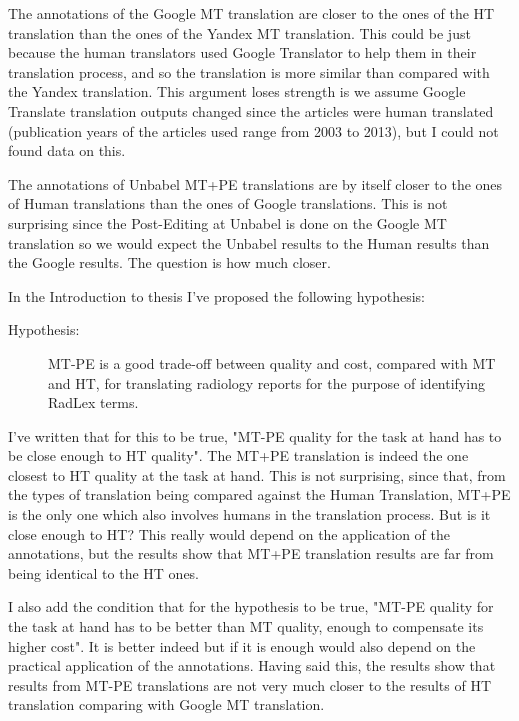The annotations of the Google MT translation are closer to the ones of the HT translation than the ones of the Yandex MT translation. This could be just because the human translators used Google Translator to help them in their translation process, and so the translation is more similar than compared with the Yandex translation. This argument loses strength is we assume Google Translate translation outputs changed since the articles were human translated (publication years of the articles used range from 2003 to 2013), but I could not found data on this. 

The annotations of Unbabel MT+PE translations are by itself closer to the ones of Human translations than the ones of Google translations. This is not surprising since the Post-Editing at Unbabel is done on the Google MT translation so we would expect the Unbabel results to the Human results than the Google results. The question is how much closer. 

In the Introduction to thesis I've proposed the following hypothesis:

\begin{description}
	\item[Hypothesis:] MT-PE is a good trade-off between quality and cost, compared with MT and HT, for translating radiology reports for the purpose of identifying RadLex terms. 
\end{description}


I've written that for this to be true, "MT-PE quality for the task at hand has to be close enough to HT quality". The MT+PE translation is indeed the one closest to HT quality at the task at hand. This is not surprising, since that, from the types of translation being compared against the Human Translation, MT+PE is the only one which also involves humans in the translation process. But is it close enough to HT? This really would depend on the application of the annotations, but the results show that MT+PE translation results are far from being identical to the HT ones.  

I also add the condition that for the hypothesis to be true, "MT-PE quality for the task at hand has to be better than MT quality, enough to compensate its higher cost". It is better indeed but if it is enough would also depend on the practical application of the annotations. Having said this, the results show that results from MT-PE translations are not very much closer to the results of HT translation comparing with Google MT translation. 

